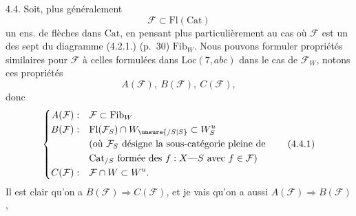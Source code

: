4.4. Soit, plus généralement
\[
\mathcal F\subset\mathrm{Fl}(\mathrm{Cat})
\]
un ens. de flèches dans $\mathrm{Cat}$, en pensant
plus particulièrement au cas où $\mathcal F$ est un
des sept   du diagramme
(4.2.1.) (p.~30)   $\mathrm{Fib}_W$.
 Nous
pouvons formuler   propriétés similaires
pour $\mathcal F$ à celles formulées dans $\mathrm{Loc}(7,abc)$
dans le cas de $\mathcal F_W$, notons ces
propriétés
\[
A(\mathcal F),\ B(\mathcal F),\ C(\mathcal F),
\]
donc
\[
\left\{\begin{aligned}
A(\mathcal F):&\quad\mathcal F\subset\mathrm{Fib}_W\\
B(\mathcal F):&\quad\mathrm{Fl}(\mathcal F_S)\cap W_{\unsure{/S|S}}\subset W_S^u\\
&\quad\text{(où $\mathcal F_S$ désigne la sous-catégorie pleine de}\\
&\quad\text{$\mathrm{Cat}_{/S}$ formée des $f:X\text{---}S$ avec $f\in\mathcal F$)}\\
C(\mathcal F):&\quad\mathcal F\cap W\subset W^u.
\end{aligned}\right.
\tag*{(4.4.1)}
\]
Il est clair qu'on a $B(\mathcal F)\Longrightarrow C(\mathcal F)$, et je
vais  %
\uline{} qu'on a aussi $A(\mathcal F)\Longrightarrow B(\mathcal F)$,
